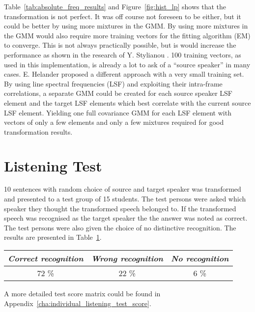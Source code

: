 Table~\ref{tab:absolute_freq_results} and Figure~\ref{fig:hist_lp} shows that the transformation is not perfect. It was off course not foreseen to be either, but it could be better by using more mixtures in the GMM. By using more mixtures in the GMM would also require more training vectors for the fitting algorithm (EM) to converge. This is not always practically possible, but is would increase the performance as shown in the research of Y. Stylianou \etal \cite{stylianou98}. 100 training vectors, as used in this implementation, is already a lot to ask of a ``source speaker'' in many cases. E. Helander \etal \cite{helander08} proposed a different approach with a very small training set. By using line spectral frequencies (LSF) and exploiting their intra-frame correlations, a separate GMM could be created for each source speaker LSF element and the target LSF elements which best correlate with the current source LSF element. Yielding one full covariance GMM for each LSF element with vectors of only a few elements and only a few mixtures required for good transformation results.

\section{Listening Test} %
\label{sec:listening_test}
10 sentences with random choice of source and target speaker was transformed and presented to a test group of 15 students. The test persons were asked which speaker they thought the transformed speech belonged to. If the transformed speech was recognised as the target speaker the the answer was noted as correct. The test persons were also given the choice of no distinctive recognition. The results are presented in Table~\ref{tab:subjective_listening_results}.
\begin{table}[htbp]
	\begin{center}
		\label{tab:subjective_listening_results}
		\begin{tabular}{ccc}
			\toprule
			\multicolumn{1}{c}{\emph{Correct recognition}} & \multicolumn{1}{c}{\emph{Wrong recognition}} & \multicolumn{1}{c}{\emph{No recognition}}\\
			\midrule
			72 \% & 22 \% & 6 \% \\
			\bottomrule			
		\end{tabular}		
	\end{center}	
\end{table}
A more detailed test score matrix could be found in Appendix~\ref{cha:individual_listening_test_score}.

